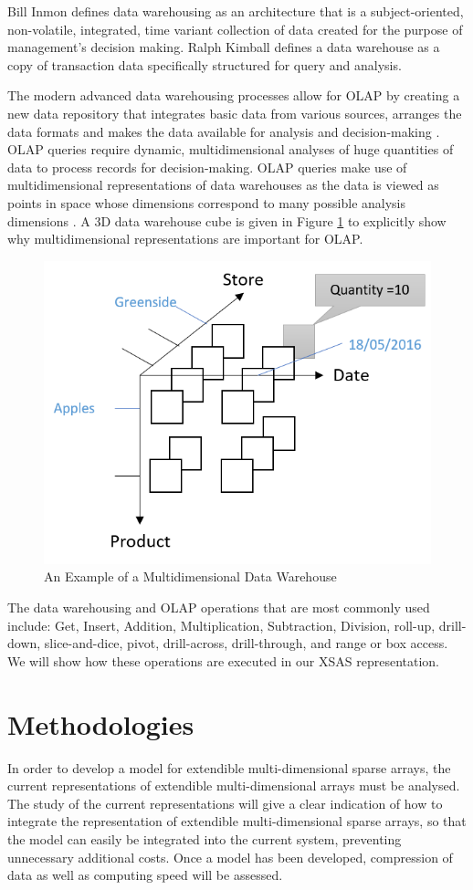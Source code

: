 Bill Inmon defines data warehousing as an architecture that is a subject-oriented, non-volatile, integrated, time variant collection of data created for the purpose of management’s decision making. Ralph Kimball defines a data warehouse as a copy of transaction data specifically structured for query and analysis.

The modern advanced data warehousing processes allow for OLAP by creating a new data repository that integrates basic data from various sources, arranges the data formats and makes the data available for analysis and decision-making \cite{golfarelli:2009:dwd}. OLAP queries require dynamic, multidimensional analyses of huge quantities of data to process records for decision-making. OLAP queries make use of multidimensional representations of data warehouses as the data is viewed as points in space whose dimensions correspond to many possible analysis dimensions \cite{golfarelli:2009:dwd}. A 3D data warehouse cube is given in Figure \ref{fig:exampleCube} to explicitly show why multidimensional representations are important for OLAP.

 \begin{figure}[H]
	\centering
	\includegraphics[width=0.6\linewidth]{exampleCube2}
	\caption{An Example of a Multidimensional Data Warehouse}
	\label{fig:exampleCube}
\end{figure}

The data warehousing and OLAP operations that are most commonly used include: Get, Insert, Addition, Multiplication, Subtraction, Division, roll-up, drill-down, slice-and-dice, pivot, drill-across, drill-through, and range or box access. We will show how these operations are executed in our XSAS representation.

\section{Methodologies}
In order to develop a model for extendible multi-dimensional sparse arrays, the current representations of extendible multi-dimensional arrays must be analysed. The study of the current representations will give a clear indication of how to integrate the representation of extendible multi-dimensional sparse arrays, so that the model can easily be integrated into the current system, preventing unnecessary additional costs. Once a model has been developed, compression of data as well as computing speed will be assessed.

